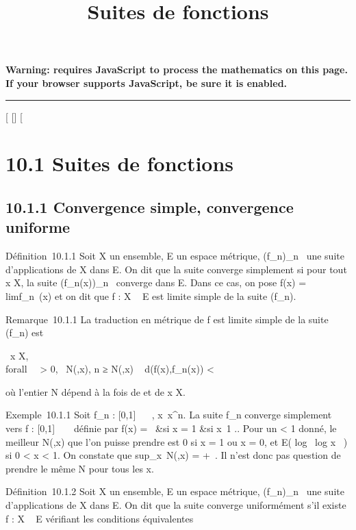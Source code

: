 \documentclass[]{article}
\title{Suites de fonctions}
\author{}
\date{}
\begin{document}
\maketitle

\textbf{Warning: 
requires JavaScript to process the mathematics on this page.\\ If your
browser supports JavaScript, be sure it is enabled.}

\begin{center}\rule{3in}{0.4pt}\end{center}

[
[]
[

\section{10.1 Suites de fonctions}

\subsection{10.1.1 Convergence simple, convergence uniforme}

Définition~10.1.1 Soit X un ensemble, E un espace métrique,
(f_n)_n\in{}~ une suite d'applications de X dans E. On dit
que la suite converge simplement si pour tout x \in X, la suite
(f_n(x))_n\in{}~ converge dans E. Dans ce cas, on pose
f(x) = limf_n~(x) et on dit que f : X
\rightarrow~ E est limite simple de la suite (f_n).

Remarque~10.1.1 La traduction en métrique de f est limite simple de la
suite (f_n) est

\forall~x \in X, \\forall~~\epsilon
> 0, \exists~N(\epsilon,x),\quad
n ≥ N(\epsilon,x) \rigtharrow~ d(f(x),f_n(x)) < \epsilon

où l'entier N dépend à la fois de \epsilon et de x \in X.

Exemple~10.1.1 Soit f_n : [0,1] \rightarrow~ ~,
x\mapsto~x^n. La suite f_n
converge simplement vers f : [0,1] \rightarrow~ ~ définie par f(x) =
\left \ &si x
= 1 &si x\neq~1 
\right .. Pour un \epsilon < 1 donné, le meilleur
N(\epsilon,x) que l'on puisse prendre est 0 si x = 1 ou x = 0, et E(
log~ \epsilon \over
log x~ ) si 0 < x < 1. On
constate que sup_x\in[0,1]~N(\epsilon,x) =
+\infty~. Il n'est donc pas question de prendre le même N pour tous les x.

Définition~10.1.2 Soit X un ensemble, E un espace métrique,
(f_n)_n\in{}~ une suite d'applications de X dans E. On dit
que la suite converge uniformément s'il existe f : X \rightarrow~ E vérifiant les
conditions équivalentes
\end{document}
